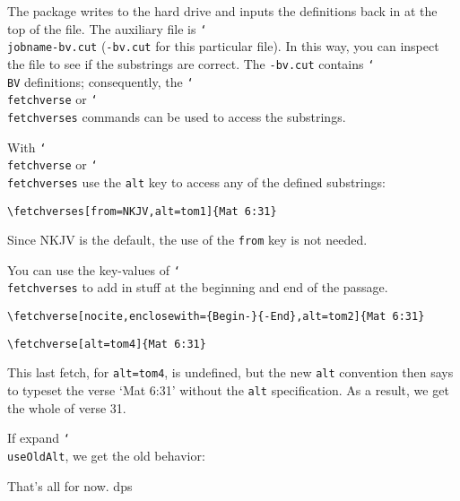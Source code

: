 \documentclass{article}
\def\cs#1{\texttt{\char`\\#1}}
\begin{document}
The package writes to the hard drive and inputs the definitions back in at
the top of the file. The auxiliary file is \cs{jobname-bv.cut}
(\texttt{\jobname-bv.cut} for this particular file). In this way, you can
inspect the file to see if the substrings are correct. The
\texttt{\jobname-bv.cut} contains \cs{BV} definitions; consequently, the
\cs{fetchverse} or \cs{fetchverses} commands can be used to access the
substrings.

With \cs{fetchverse} or \cs{fetchverses} use the \texttt{alt} key to access
any of the defined substrings:

\verb~\fetchverses[from=NKJV,alt=tom1]{Mat 6:31}~\\[3pt]

Since NKJV is the default, the use of the \texttt{from} key is not needed.

You can use the key-values of \cs{fetchverses} to add in stuff at the
beginning and end of the passage.

\verb~\fetchverse[nocite,enclosewith={Begin-}{-End},alt=tom2]{Mat 6:31}~\\[3pt]

\verb~\fetchverse[alt=tom4]{Mat 6:31}~\\[3pt]

This last fetch, for \texttt{alt=tom4}, is undefined, but the new \texttt{alt} convention
then says to typeset the verse `Mat 6:31' without the \texttt{alt} specification. As a
result, we get the whole of verse 31.

If expand \cs{useOldAlt}, we get the old behavior:\\[3pt]\useOldAlt
{}\useNewAlt

That's all for now. dps
\end{document}
